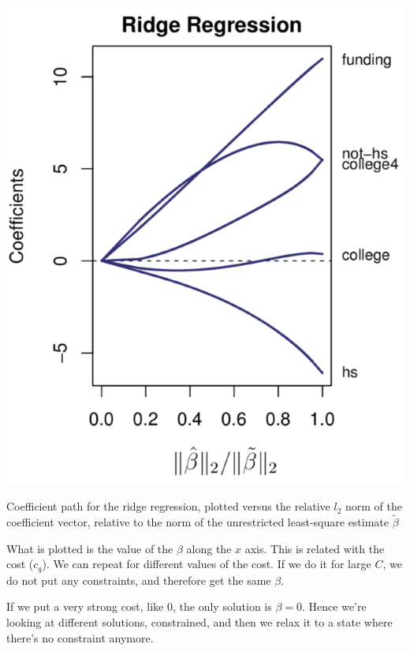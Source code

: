 \begin{marginfigure}
    \includegraphics{./Figures/ridgecrime.png}
    \caption{Coefficient path for the ridge regression, plotted versus the
        relative $l_2$ norm of the coefficient vector, relative to the norm of
        the unrestricted least-square estimate $\tilde \beta$
    }
    \label{ridgecrime}
\end{marginfigure}


What is plotted is the value of the $\beta$ along the $x$ axis. This is related
with the cost ($c_q$). 
We can repeat for different values of the cost.
If we do it for large $C$, we do not put any constraints, and therefore get the same $\beta$.

If we put a very strong cost, like $0$, the only solution is $\beta = 0$.
Hence we’re looking at different solutions, constrained, and then we relax it to
a state where there’s no constraint anymore.

